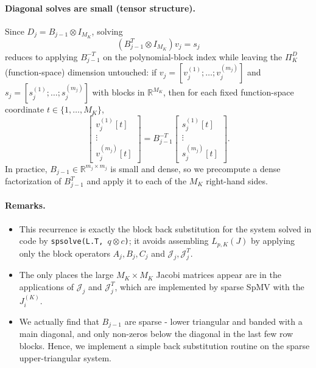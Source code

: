 \documentclass[11pt]{article}
\begin{document}
\paragraph{Diagonal solves are small (tensor structure).}
Since $D_j=B_{j-1}\otimes I_{M_K}$, solving
\[
(B_{j-1}^T\otimes I_{M_K}) v_j = s_j
\]
reduces to applying $B_{j-1}^{-T}$ on the polynomial-block index while leaving the
$\Pi_K^D$ (function-space) dimension untouched:
if $v_j=[v_j^{(1)};\dots;v_j^{(m_j)}]$ and $s_j=[s_j^{(1)};\dots;s_j^{(m_j)}]$ with blocks in $\mathbb{R}^{M_K}$,
then for each fixed function-space coordinate $t\in\{1,\dots,M_K\}$,
\[
\begin{bmatrix}
	v_j^{(1)}[t]\\ \vdots\\ v_j^{(m_j)}[t]
\end{bmatrix}
=
B_{j-1}^{-T}
\begin{bmatrix}
	s_j^{(1)}[t]\\ \vdots\\ s_j^{(m_j)}[t]
\end{bmatrix}.
\]
In practice, $B_{j-1}\in\mathbb{R}^{m_j\times m_j}$ is small and dense, so we precompute
a dense factorization of $B_{j-1}^T$ and apply it to each of the $M_K$ right-hand sides.

\paragraph{Remarks.}
\begin{itemize}
	\item This recurrence is exactly the block back substitution for the system solved in code by
	\texttt{spsolve(L.T, $q \otimes c$)}; it avoids assembling $L_{p,K}(J)$ by applying only the
	block operators $A_j,B_j,C_j$ and $\mathcal J_j,\mathcal J_j^T$.
	\item The only places the large $M_K\times M_K$ Jacobi matrices appear are in the applications
	of $\mathcal J_j$ and $\mathcal J_j^T$, which are implemented by sparse SpMV with the $J_i^{(K)}$.
	\item \color{red} We actually find that $B_{j-1}$ are sparse - lower triangular and banded with a main diagonal, and only non-zeros below the diagonal in the last few row blocks. Hence, we implement a simple back substitution routine on the sparse upper-triangular system. \color{black}
\end{itemize}

	
	
	
\end{document}
